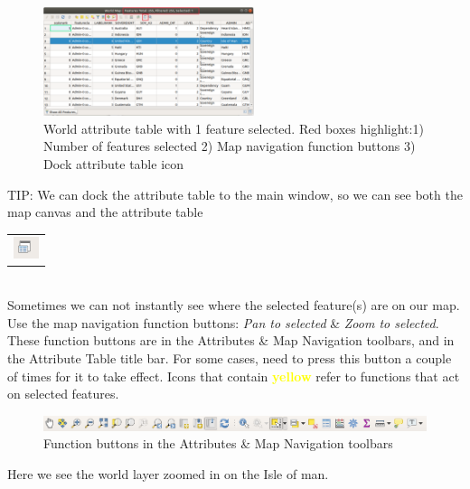 \begin{figure}[!h]
	\centering
	\includegraphics[width=0.55\textwidth]{images/world_attribute_table_select1_redbox.png}%
	\caption{World attribute table with 1 feature selected. Red boxes highlight:1) Number of features selected 2) Map navigation function buttons 3) Dock attribute table icon}
	\label{ft_fig_firstfig3}
\end{figure}

TIP: We can dock the attribute table to the main window, so we can see both the map canvas and the attribute table 
\begin{tabular}{@{}c@{}}\includegraphics[width=4ex]{images/dock_attribute_table_icon.png}\end{tabular}\\

Sometimes we can not instantly see where the selected feature(s) are on our map. Use the map navigation function buttons: \textit{Pan to selected} \& \textit{Zoom to selected}. These function buttons are in the Attributes \& Map Navigation toolbars, and in the Attribute Table title bar. For some cases, need to press this button a couple of times for it to take effect. Icons that contain \textbf{\textcolor{yellow}{yellow}} refer to functions that act on selected features.

\begin{figure}[!h]
	\centering
	\includegraphics[width=1\textwidth]{images/attribute_and_map_navigation_toolbars_icons.png}
	\caption{Function buttons in the Attributes \& Map Navigation toolbars}
	\label{ft_fig_firstfig3}
\end{figure}

Here we see the world layer zoomed in on the Isle of man.\\

